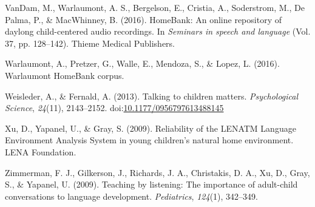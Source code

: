 \documentclass[english,floatsintext,man]{apa6}
\begin{document}
\hypertarget{ref-vandam2016homebank}{}
VanDam, M., Warlaumont, A. S., Bergelson, E., Cristia, A., Soderstrom,
M., De Palma, P., \& MacWhinney, B. (2016). HomeBank: An online
repository of daylong child-centered audio recordings. In \emph{Seminars
in speech and language} (Vol. 37, pp. 128--142). Thieme Medical
Publishers.

\hypertarget{ref-warlaumont2016warlaumont}{}
Warlaumont, A., Pretzer, G., Walle, E., Mendoza, S., \& Lopez, L.
(2016). Warlaumont HomeBank corpus.

\hypertarget{ref-Weisleder2013a}{}
Weisleder, A., \& Fernald, A. (2013). Talking to children matters.
\emph{Psychological Science}, \emph{24}(11), 2143--2152.
doi:\href{https://doi.org/10.1177/0956797613488145}{10.1177/0956797613488145}

\hypertarget{ref-Xu2009a}{}
Xu, D., Yapanel, U., \& Gray, S. (2009). Reliability of the LENATM
Language Environment Analysis System in young children's natural home
environment. LENA Foundation.

\hypertarget{ref-zimmerman2009}{}
Zimmerman, F. J., Gilkerson, J., Richards, J. A., Christakis, D. A., Xu,
D., Gray, S., \& Yapanel, U. (2009). Teaching by listening: The
importance of adult-child conversations to language development.
\emph{Pediatrics}, \emph{124}(1), 342--349.
\end{document}
